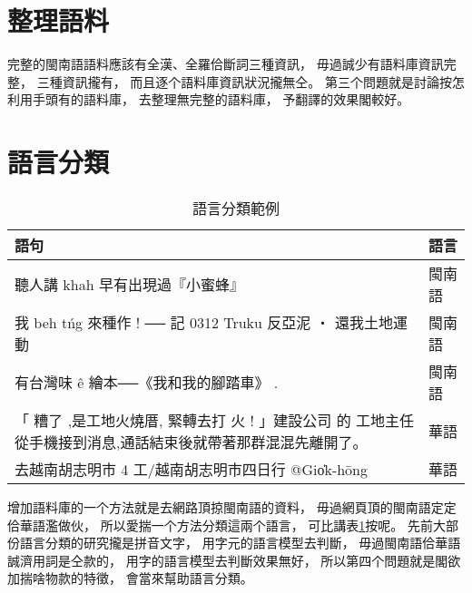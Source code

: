 
\section{整理語料}
\label{節：整理語料}
完整的閩南語語料應該有全漢、全羅佮斷詞三種資訊，
毋過誠少有語料庫資訊完整，
三種資訊攏有，
而且逐个語料庫資訊狀況攏無仝。
第三个問題就是討論按怎利用手頭有的語料庫，
去整理無完整的語料庫，
予翻譯的效果閣較好。



\section{語言分類}
\label{節：語言分類}

\begin{table}
\caption{語言分類範例}
\label{表：語言分類範例}
\centering
\begin{tabular}{p{30em}l}
語句 & 語言\\
\hline
聽人講 khah 早有出現過『小蜜蜂』 & 閩南語\\
我 beh tńg 來種作 ! ── 記 0312 Truku 反亞泥 ‧ 還我土地運動 & 閩南語\\
有台灣味 ê 繪本──《我和我的腳踏車》 . & 閩南語\\
「 糟了 ,是工地火燒厝, 緊轉去打 火 ! 」建設公司 的 工地主任從手機接到消息,通話結束後就帶著那群混混先離開了。 & 華語\\
去越南胡志明市 4 工/越南胡志明市四日行 @Gio̍k-hōng & 華語\\
\end{tabular}
\end{table}

增加語料庫的一个方法就是去網路頂掠閩南語的資料，
毋過網頁頂的閩南語定定佮華語濫做伙，
所以愛揣一个方法分類這兩个語言，
可比講表\ref{表：語言分類範例}按呢。
先前大部份語言分類的研究攏是拼音文字，
用字元的語言模型去判斷，
毋過閩南語佮華語誠濟用詞是仝款的，
用字的語言模型去判斷效果無好，
所以第四个問題就是閣欲加揣啥物款的特徵，
會當來幫助語言分類。



